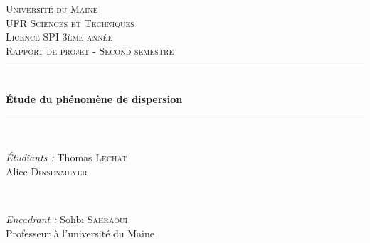 \documentclass[a4paper,11pt]{report} %
\begin{document}

\begin{titlepage}

\newcommand{\HRule}{\rule{\linewidth}{0.5mm}} %

\center %
 
 

\textsc{\large Université du Maine \\ UFR Sciences et Techniques}\\[0.5cm] %

\textsc{\Large Licence SPI 3ème année}\\[1.0cm] %
\textsc{\large Rapport de projet - Second semestre}\\[0.5cm] %
\bigskip \bigskip


\HRule \\[0.6cm]
{ \bfseries Étude du phénomène de dispersion}\\[0.4cm] %
\HRule \\[1.5cm]
 

\begin{minipage}{0.4\textwidth}
\begin{flushleft} \large
\emph{Étudiants :} \newline \newline
\large Thomas \textsc{\large Lechat}\\
\large Alice \textsc{\large Dinsenmeyer}\\
\end{flushleft}
\end{minipage}
~
\begin{minipage}{0.4\textwidth}
\begin{flushright} \large
\emph{Encadrant :} \newline \newline
\large Sohbi \textsc{\large Sahraoui}\\
Professeur à l'université du Maine
\end{flushright}
\end{minipage}\\[4cm]


\end{titlepage}
\end{document}
